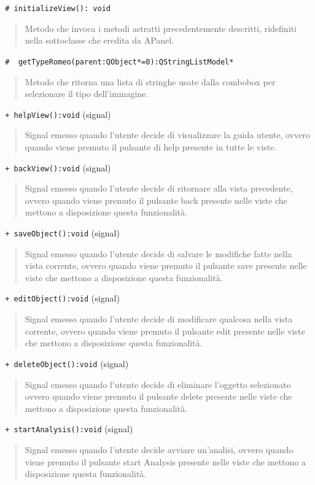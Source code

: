 \color{blue}\verb! # initializeView(): void !
\color{black} 
\begin{quote}
Metodo che invoca i metodi astratti precedentemente descritti, ridefiniti nella sottoclasse che eredita da APanel.
\end{quote}
\color{blue}\verb! #  getTypeRomeo(parent:QObject*=0):QStringListModel*!
\color{black} 
\begin{quote}
Metodo che ritorna una lista di stringhe usate dalla combobox per selezionare il tipo dell'immagine.
\end{quote}
\color{black}
\pagebreak
\color{blue}\verb! + helpView():void! (signal)
\color{black} 
\begin{quote}
Signal\g{} emesso quando l'utente decide di visualizzare la guida utente, ovvero quando viene premuto il pulsante di help presente in tutte le viste.
\end{quote}
\color{blue}\verb! + backView():void! (signal)
\color{black} 
\begin{quote}
Signal\g{} emesso quando l'utente decide di ritornare alla vista precedente, ovvero quando viene premuto il pulsante back presente nelle viste che mettono a disposizione questa funzionalità.
\end{quote}
\color{blue}\verb! + saveObject():void! (signal)
\color{black} 
\begin{quote}
Signal\g{} emesso quando l'utente decide di salvare le modifiche fatte nella vista corrente, ovvero quando viene premuto il pulsante save presente nelle viste che mettono a disposizione questa funzionalità.
\end{quote}
\color{blue}\verb! + editObject():void! (signal)
\color{black} 
\begin{quote}
Signal\g{} emesso quando l'utente decide di modificare qualcosa nella vista corrente, ovvero quando viene premuto il pulsante edit presente nelle viste che mettono a disposizione questa funzionalità.
\end{quote}
\color{blue}\verb! + deleteObject():void! (signal)
\color{black} 
\begin{quote}
Signal\g{} emesso quando l'utente decide di eliminare l'oggetto selezionato ovvero quando viene premuto il pulsante delete presente nelle viste che mettono a disposizione questa funzionalità.
\end{quote}
\color{blue}\verb! + startAnalysis():void! (signal)
\color{black} 
\begin{quote}
Signal\g{} emesso quando l'utente decide avviare un'analisi, ovvero quando viene premuto il pulsante start Analysis presente nelle viste che mettono a disposizione questa funzionalità.
\end{quote}
